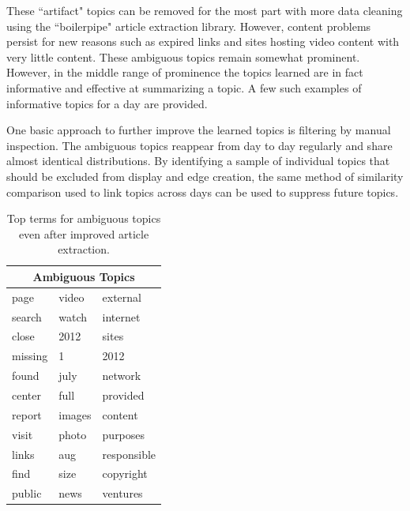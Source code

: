 \documentclass[10pt,twocolumn]{article}
\begin{document}
These ``artifact" topics can be removed for the most part with more data cleaning using the ``boilerpipe" article extraction library.  However, content problems persist for new reasons such as expired links and sites hosting video content with very little content.  These ambiguous topics remain somewhat prominent.  However, in the middle range of prominence the topics learned are in fact informative and effective at summarizing a topic.  A few such examples of informative topics for a day are provided.

One basic approach to further improve the learned topics is filtering by manual inspection.  The ambiguous topics reappear from day to day regularly and share almost identical distributions.  By identifying a sample of individual topics that should be excluded from display and edge creation, the same method of similarity comparison used to link topics across days can be used to suppress future topics.

\begin{table}
\begin{center}
\begin{tabular}{|l|l|l|}
  \hline
  \multicolumn{3}{|c|}{Ambiguous Topics} \\
  \hline
page & video & external \\
search & watch & internet \\
close & 2012 & sites \\
missing & 1 & 2012 \\
found & july & network \\
center & full & provided \\
report & images & content \\
visit & photo & purposes \\
links & aug & responsible \\
find & size & copyright \\
public & news & ventures \\
  \hline
\end{tabular}
\caption*{Top terms for ambiguous topics even after improved article extraction.}
\end{center}
\end{table}
\end{document}
